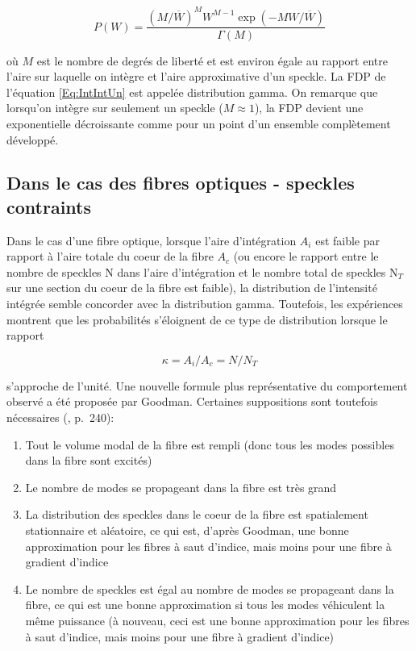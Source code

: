 \documentclass{article}       %
\begin{document}
\begin{equation}
\label{Eq:IntIntUn}
    P(W) = \frac{(M/\overline{W})^{M}W^{M-1}\exp(-MW/\overline{W})}{\Gamma(M)}
\end{equation}

où $M$ est le nombre de degrés de liberté et est environ égale au rapport entre l'aire sur laquelle on intègre et l'aire approximative d'un speckle. La FDP de l'équation \ref{Eq:IntIntUn} est appelée 
distribution gamma. On remarque que lorsqu'on intègre sur seulement un speckle ($M\approx1$), la FDP devient une exponentielle décroissante comme pour un point d'un ensemble complètement développé.

\subsection{Dans le cas des fibres optiques - speckles contraints}
\label{Sec:SpeckCons}

Dans le cas d'une fibre optique, lorsque l'aire d'intégration $A_i$ est faible par rapport à l'aire totale du coeur de la fibre $A_c$ (ou encore le rapport entre le nombre de speckles N dans l'aire d'intégration et le nombre total de speckles N$_T$ sur une section du coeur de la fibre est faible), la distribution de l'intensité intégrée semble concorder avec la distribution gamma. Toutefois, les expériences montrent que les probabilités s'éloignent de ce type de distribution lorsque le rapport

\begin{equation*}
    \kappa = A_{i}/A_{c} = N/N_{T}
\end{equation*}

s'approche de l'unité. Une nouvelle formule plus représentative du comportement observé a été proposée par Goodman. Certaines suppositions sont toutefois nécessaires (\cite{Manuel}, p.~240):\\
\begin{enumerate}
    \item Tout le volume modal de la fibre est rempli (donc tous les modes possibles dans la fibre sont excités)
    
    \item Le nombre de modes se propageant dans la fibre est très grand
    
    \item La distribution des speckles dans le coeur de la fibre est spatialement stationnaire et aléatoire, ce qui est, d'après Goodman, une bonne approximation pour les fibres à saut d'indice, mais moins pour une fibre à gradient d'indice
    
    \item Le nombre de speckles est égal au nombre de modes se propageant dans la fibre, ce qui est une bonne approximation si tous les modes véhiculent la même puissance (à nouveau, ceci est une bonne approximation pour les fibres à saut d'indice, mais moins pour une fibre à gradient d'indice)
\end{enumerate}
\end{document}
